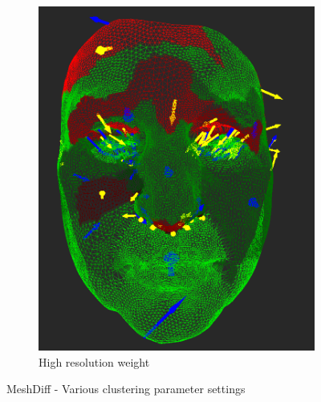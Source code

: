\begin{figure}[h]
\begin{subfigure}{0.3\textwidth}
	\includegraphics[width=\textwidth]{./img/meshdiff-high_resolution.PNG}
	\caption{High resolution weight}
	\label{fig:meshdiff_high_resolution}
	\end{subfigure}
\caption[MeshDiff - Various clustering parameter settings]{MeshDiff - Various clustering parameter settings}
\end{figure}